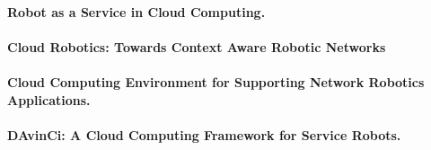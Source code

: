 \documentclass[10pt,letterpaper]{article}
\begin{document}
\paragraph{Robot as a Service in Cloud Computing.}

\cite{YiZhGa:10}

\paragraph{Cloud Robotics: Towards Context Aware Robotic Networks}

\cite{QuMeDi:11}

\paragraph{Cloud Computing Environment for Supporting Network Robotics Applications.}

\cite{AgOlFePa:11}

\paragraph{DAvinCi: A Cloud Computing Framework for Service Robots.}

\cite{ArEnLiWu:10}



\end{document}
